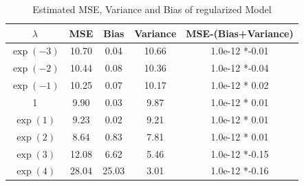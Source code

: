 \documentclass[a4]{article}
\begin{document}
\begin{table} [h]
	\caption{Estimated MSE, Variance and Bias of regularized Model}
	\centering
	\label{table:EvalD}
	\begin{tabular}{c c c c c}
		\toprule
		$\lambda$ & MSE &  Bias &  Variance  & MSE-(Bias+Variance)\\ 
		\midrule
		 $\exp(-3)$ & 10.70&  0.04 &  10.66   & 1.0e-12 *-0.01\\
		 $\exp(-2)$ & 10.44&  0.08  &  10.36 & 1.0e-12 *-0.04 \\
		 $\exp(-1)$ & 10.25&  0.07 & 10.17  &1.0e-12 *  0.02 \\
		 1 & 9.90&  0.03  & 9.87  & 1.0e-12 * 0.01 \\
		 $\exp(1)$ &  9.23&  0.02 & 9.21  & 1.0e-12 * 0.01 \\
		 $\exp(2)$ & 8.64&  0.83  &  7.81 & 1.0e-12 * 0.01  \\
		 $\exp(3)$ &  12.08& 6.62  &  5.46  & 1.0e-12 *-0.15 \\
		$\exp(4)$ & 28.04&  25.03  &  3.01 & 1.0e-12 *-0.16\\
		\bottomrule
	\end{tabular}
\end{table}






 
 
\end{document}
